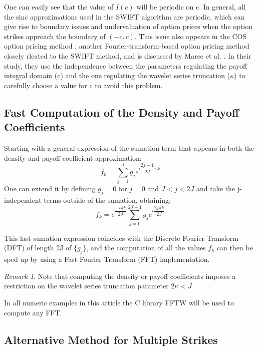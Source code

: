 \documentclass[12,twoside]{mammeTFM}
\theoremstyle{definition}
\theoremstyle{remark}
\newtheorem{remark}[thm]{Remark}
\begin{document}
One can easily see that the value of $I(c)$ will be periodic on c. In general, all the sinc approximations used in the SWIFT algorithm are periodic, which can give rise to boundary issues and undervaluation of option prices when the option strikes approach the boundary of $(-c, c)$. This issue also appears in the COS option pricing method \cite{Fang2008}, another Fourier-transform-based option pricing method closely rleated to the SWIFT method, and is discussed by Maree et al. \cite{mar17}. In their study, they use the independence between the parameters regulating the payoff integral domain (c) and the one regulating the wavelet series truncation ($\kappa$) to carefully choose a value for c to avoid this problem.

\subsection{Fast Computation of the Density and Payoff Coefficients}
Starting with a general expression of the sumation term that appears in both the density and payoff coefficient approximation:
\begin{equation}
f_k = \sum_{j=1}^J g_j e^{i \dfrac{2j - 1}{2J}\pi k}
\end{equation}
One can extend it by defining $g_j = 0$ for $j = 0$ and $J < j < 2J$ and take the j-independent terms outside of the sumation, obtaining:
\begin{equation}
f_k = e^{\dfrac{-i \pi k}{2J}}\sum_{j=0}^{2J - 1} g_j e^{i \dfrac{2j\pi k}{2J}}
\end{equation}

This last sumation expression coincides with the Discrete Fourier Transform (DFT) of length 2J of $\{g_j\}$, and the computation of all the values $f_k$ can then be sped up by using a Fast Fourier Transform (FFT) implementation. 

\begin{remark}
Note that computing the density or payoff coefficients imposes a restriction on the wavelet series truncation parameter $2 \kappa < J$
\end{remark}

In all numeric examples in this article the C library FFTW will be used to compute any FFT.

\subsection{Alternative Method for Multiple Strikes}
\end{document}
